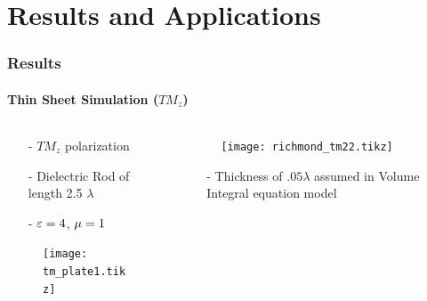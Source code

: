 \documentclass[mathserif,16pt,xcolor=table]{beamer}
\begin{document}
      \section{Results and Applications}
      \begin{frame}
      \frametitle{Results}
      \framesubtitle{Thin Sheet Simulation ($TM_z$)}
      \begin{columns}[T] %
        \begin{column}{.5\textwidth}
          \begin{itemize}
            \item[-]{$TM_z$ polarization}
            \item[-]{Dielectric Rod of length 2.5 $\lambda$}
            \item[-]{$\varepsilon = 4$, $\mu = 1$}
          \end{itemize}
          \begin{figure}
            \centering
            \texttt{[image: tm\_plate1.tikz]}
            \label{fig:tm_plate}
          \end{figure}
        \end{column}
        \begin{column}[T]{.5\textwidth}
          \begin{figure} \vspace*{-1cm}
            \texttt{[image: richmond\_tm22.tikz]}
            \label{fig:TM_rcs}
          \end{figure}
          \begin{itemize}
            \item[-]{Thickness of $.05 \lambda$ assumed in Volume Integral equation model}
          \end{itemize}
          \end{column}%
        \end{columns}
      \end{frame}
\end{document}
